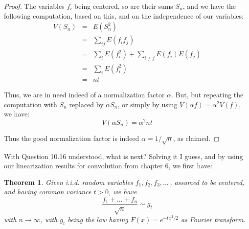 \documentclass[12pt]{amsbook}
\newtheorem{theorem}{Theorem}[chapter]
\begin{document}
\begin{proof}
The variables $f_i$ being centered, so are their sums $S_n$, and we have the following computation, based on this, and on the independence of our variables:
\begin{eqnarray*}
V(S_n)
&=&E(S_n^2)\\
&=&\sum_{ij}E(f_if_j)\\
&=&\sum_iE(f_i^2)+\sum_{i\neq j}E(f_i)E(f_j)\\
&=&\sum_iE(f_i^2)\\
&=&nt
\end{eqnarray*}

Thus, we are in need indeed of a normalization factor $\alpha$. But, but repeating the computation with $S_n$ replaced by $\alpha S_n$, or simply by using $V(\alpha f)=\alpha^2V(f)$, we have:
$$V(\alpha S_n)=\alpha^2nt$$

Thus the good normalization factor is indeed $\alpha=1/\sqrt{n}$, as claimed.
\end{proof}

With Question 10.16 understood, what is next? Solving it I guess, and by using our linearization results for convolution from chapter 6, we first have:

\begin{theorem}
Given i.i.d. random variables $f_1,f_2,f_3,\ldots\,$, assumed to be centered, and having common variance $t>0$, we have
$$\frac{f_1+\ldots+f_n}{\sqrt{n}}\sim g_t$$
with $n\to\infty$, with $g_t$ being the law having $F(x)=e^{-tx^2/2}$ as Fourier transform.
\end{theorem}
\end{document}
